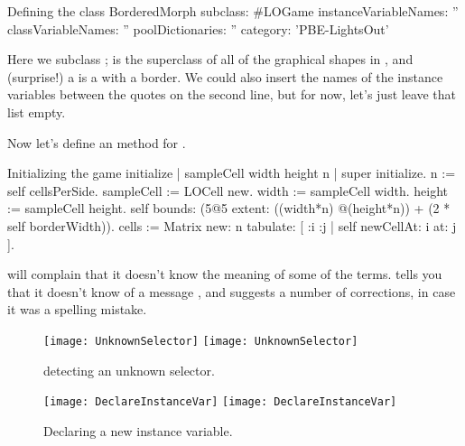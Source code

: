 \documentclass[a4paper,10pt,twoside]{book}
\begin{document}
{
\begin{classdef}[sbegame]{Defining the  class}
BorderedMorph subclass: #LOGame
   instanceVariableNames: ''
   classVariableNames: ''
   poolDictionaries: ''
   category: 'PBE-LightsOut'
\end{classdef}

Here we subclass ;  is the superclass of all of the graphical shapes in \pharo, and (surprise!) a  is a  with a border.  
We could also insert the names of the instance variables between the quotes on the second line, but for now, let's just leave that list empty.

Now let's define an  method for .


\begin{numMethod}[sbegameinitialize]{Initializing the game}
initialize
   | sampleCell width height n |
   super initialize.
   n := self cellsPerSide.
   sampleCell := LOCell new.
   width := sampleCell width.
   height := sampleCell height.
   self bounds: (5@5 extent: ((width*n) @(height*n)) + (2 * self borderWidth)).
   cells := Matrix new: n tabulate: [ :i :j | self newCellAt: i at: j ].
\end{numMethod}


\pharo will complain that it doesn't know the meaning of some of the terms.
\pharo tells you that it doesn't know of a message , and suggests a number of corrections, in case it was a spelling mistake.


\begin{figure}[htb]
\begin{minipage}{0.48\textwidth}
	\centering
	\ifluluelse
		{\texttt{[image: UnknownSelector]}}
		{\texttt{[image: UnknownSelector]}}
	\caption{\pharo detecting an unknown selector.}
\end{minipage}
\hfill
\begin{minipage}{0.48\textwidth}
	\centering
	\ifluluelse
		{\texttt{[image: DeclareInstanceVar]}}
		{\texttt{[image: DeclareInstanceVar]}}
	\caption{Declaring a new instance variable.}
\end{minipage}
\end{figure}

}
\end{document}

